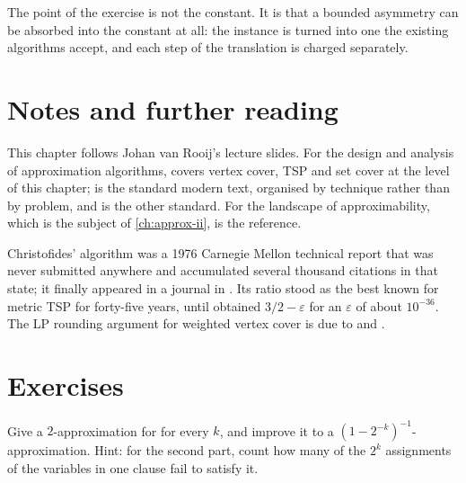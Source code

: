 The point of the exercise is not the constant. It is that a bounded asymmetry
can be absorbed into the constant at all: the instance is turned into one the
existing algorithms accept, and each step of the translation is charged
separately.

\section{Notes and further reading}
\label{sec:approx-i-further-reading}

This chapter follows Johan van Rooij's lecture slides. For the design and
analysis of approximation algorithms, \citet[Chapter~35]{CLRS2022} covers
vertex cover, TSP and set cover at the level of this chapter;
\citet{WilliamsonShmoys2011} is the standard modern text, organised by
technique rather than by problem, and \citet{Vazirani2001} is the other
standard. For the landscape of approximability, which is the subject of
\cref{ch:approx-ii}, \citet[Chapter~3]{Ausiello1999} is the reference.

Christofides' algorithm was a 1976 Carnegie Mellon technical report that was
never submitted anywhere and accumulated several thousand citations in that
state; it finally appeared in a journal in \citet{Christofides2022}. Its ratio
stood as the best known for metric TSP for forty-five years, until
\citet{KarlinKleinOveisGharan2021} obtained $3/2 - \varepsilon$ for an
$\varepsilon$ of about $10^{-36}$. The LP rounding argument for weighted vertex cover is due
to \citet{Hochbaum1982} and \citet{BarYehudaEven1981}.

\section{Exercises}
\label{sec:ex-approx-i}

\begin{exercise}
Give a $2$-approximation for  for every $k$, and improve it
to a $(1 - 2^{-k})^{-1}$-approximation. Hint: for the second part, count how
many of the $2^k$ assignments of the variables in one clause fail to satisfy it.
\end{exercise}

